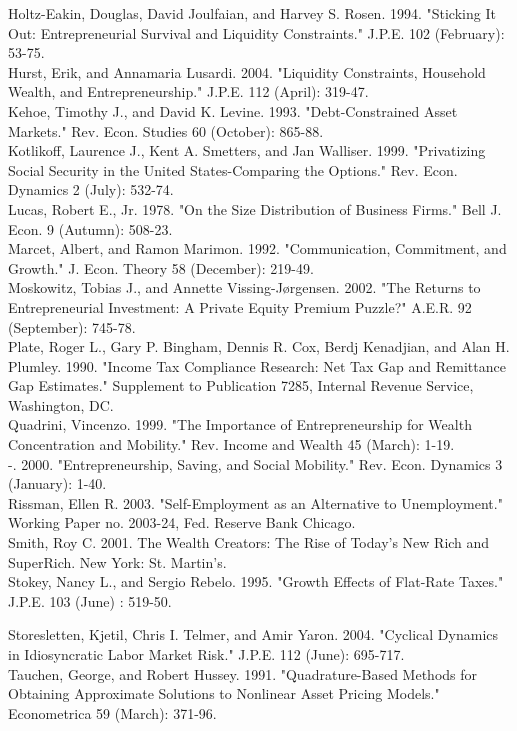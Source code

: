 \documentclass[10pt]{article}
\begin{document}
Holtz-Eakin, Douglas, David Joulfaian, and Harvey S. Rosen. 1994. "Sticking It Out: Entrepreneurial Survival and Liquidity Constraints." J.P.E. 102 (February): 53-75.\\
Hurst, Erik, and Annamaria Lusardi. 2004. "Liquidity Constraints, Household Wealth, and Entrepreneurship." J.P.E. 112 (April): 319-47.\\
Kehoe, Timothy J., and David K. Levine. 1993. "Debt-Constrained Asset Markets." Rev. Econ. Studies 60 (October): 865-88.\\
Kotlikoff, Laurence J., Kent A. Smetters, and Jan Walliser. 1999. "Privatizing Social Security in the United States-Comparing the Options." Rev. Econ. Dynamics 2 (July): 532-74.\\
Lucas, Robert E., Jr. 1978. "On the Size Distribution of Business Firms." Bell J. Econ. 9 (Autumn): 508-23.\\
Marcet, Albert, and Ramon Marimon. 1992. "Communication, Commitment, and Growth." J. Econ. Theory 58 (December): 219-49.\\
Moskowitz, Tobias J., and Annette Vissing-Jørgensen. 2002. "The Returns to Entrepreneurial Investment: A Private Equity Premium Puzzle?" A.E.R. 92 (September): 745-78.\\
Plate, Roger L., Gary P. Bingham, Dennis R. Cox, Berdj Kenadjian, and Alan H. Plumley. 1990. "Income Tax Compliance Research: Net Tax Gap and Remittance Gap Estimates." Supplement to Publication 7285, Internal Revenue Service, Washington, DC.\\
Quadrini, Vincenzo. 1999. "The Importance of Entrepreneurship for Wealth Concentration and Mobility." Rev. Income and Wealth 45 (March): 1-19.\\
-. 2000. "Entrepreneurship, Saving, and Social Mobility." Rev. Econ. Dynamics 3 (January): 1-40.\\
Rissman, Ellen R. 2003. "Self-Employment as an Alternative to Unemployment." Working Paper no. 2003-24, Fed. Reserve Bank Chicago.\\
Smith, Roy C. 2001. The Wealth Creators: The Rise of Today's New Rich and SuperRich. New York: St. Martin's.\\
Stokey, Nancy L., and Sergio Rebelo. 1995. "Growth Effects of Flat-Rate Taxes." J.P.E. 103 (June) : 519-50.

Storesletten, Kjetil, Chris I. Telmer, and Amir Yaron. 2004. "Cyclical Dynamics in Idiosyncratic Labor Market Risk." J.P.E. 112 (June): 695-717.\\
Tauchen, George, and Robert Hussey. 1991. "Quadrature-Based Methods for Obtaining Approximate Solutions to Nonlinear Asset Pricing Models." Econometrica 59 (March): 371-96.
\end{document}
